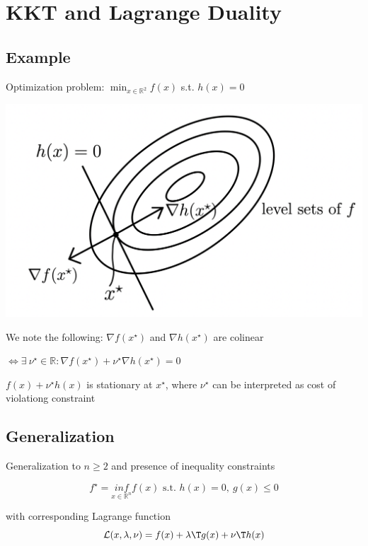 \section{KKT and Lagrange Duality}

\subsection{Example}

Optimization problem:
$\min _{x \in \mathbb{R}^2} f(x)$ s.t. $h(x)=0$

\includegraphics[width=\columnwidth]{images/op_eq_constraints.png}

We note the following:
$\nabla f(x^\star)$ and $\nabla h(x^\star)$ are colinear


$\Leftrightarrow \exists\ \nu^\star \in \mathbb{R}: \nabla f(x^\star)+\nu^\star\nabla h(x^\star) = 0$

$f(x)+\nu^\star h(x)$ is stationary at $x^\star$,
where $\nu^\star$ can be interpreted as cost of violationg constraint

\subsection{Generalization}

Generalization to $n \ge 2$ and presence of inequality constraints

\begin{equation}
	f^\star = \underset{x \in \mathcal{\mathbb{R}}^n}{inf}f(x) \text{ s.t. } h(x)=0,\ g(x) \le 0
	\label{eq:dual}
\end{equation}

with corresponding Lagrange function
\begin{equation}
	\mathcal{L}(x,\lambda,\nu) = f(x) + \lambda\T g(x)+\nu\T h(x)
\end{equation}

